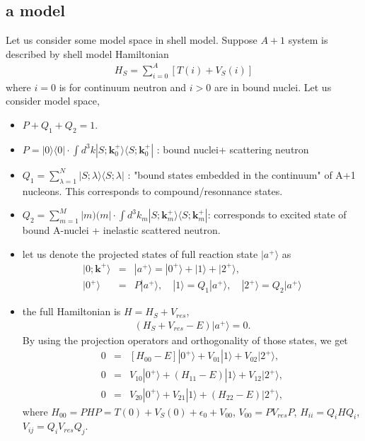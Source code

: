 \documentclass[11pt]{book}
\def\bm{\boldsymbol}
\def\vk{{\bm k}}
\def\la{\langle}
\def\ra{\rangle}
\newcommand{\bea}{\begin{eqnarray}}
\newcommand{\eea}{\end{eqnarray}}
\newcommand{\no}{\nonumber \\}
\begin{document}
\subsection{ a model } 
Let us consider some model space in shell model. Suppose $A+1$ system is described by shell model
Hamiltonian
\bea 
H_S = \sum_{i=0}^A [T(i)+V_S(i)]
\eea 
where $i=0$ is for continuum neutron and $i>0$ are in bound nuclei. 
Let us consider model space, 
\begin{itemize}
	\item $P+Q_1+Q_2=1$.
	\item $P=|0\ra\la 0|\cdot \int d^3 k |S;\vk_0^{+}\ra \la S;\vk_0^{+}|$ : bound nuclei+ scattering neutron 
	\item $Q_1=\sum_{\lambda=1}^N |S;\lambda\ra\la S;\lambda|$ : "bound states embedded in the continuum"
	 of A+1 nucleons. This corresponds to compound/resonnance states. 
	 \item $Q_2=\sum_{m=1}^M |m)(m| \cdot \int d^3 k_m |S;\vk_m^{+}\ra \la S;\vk_m^{+}| $:
	   corresponds to excited state of bound A-nuclei + inelastic scattered neutron. 
	 \item let us denote the projected states of full reaction state $|a^{+}\ra$ as
	   \bea 
	   |0;\vk^{+}\ra &=& |a^{+}\ra = |0^{+}\ra +|1\ra+|2^{+}\ra ,\no 
	   |0^+\ra &=& P |a^{+}\ra,\quad |1\ra = Q_1|a^{+}\ra,\quad |2^{+}\ra = Q_2 |a^{+}\ra 
	   \eea 
	\item the full Hamiltonian is $H=H_S+V_{res}$,
	  \bea 
	  (H_S+V_{res}-E)|a^{+}\ra =0.
	  \eea     
	  By using the projection operators and orthogonality of those states, we get 
	  \bea 
	  0 &=& [H_{00}-E]|0^{+}\ra +V_{01}|1\ra +V_{02}|2^{+}\ra, \no 
	  0 &=&  V_{10}|0^+\ra +(H_{11}-E)|1\ra +V_{12}|2^{+}\ra ,\no 
	  0 &=&  V_{20}|0^+\ra + V_{21}|1\ra +(H_{22}-E)|2^+\ra ,
	  \eea 
	  where $H_{00}=P H P = T(0)+V_S(0)+\epsilon_0+V_{00}$, $V_{00}=PV_{res}P$,
	         $H_{ii}=Q_i H Q_i$, $V_{ij}= Q_i V_{res}Q_j$.     
\end{itemize} 	 
\end{document}
